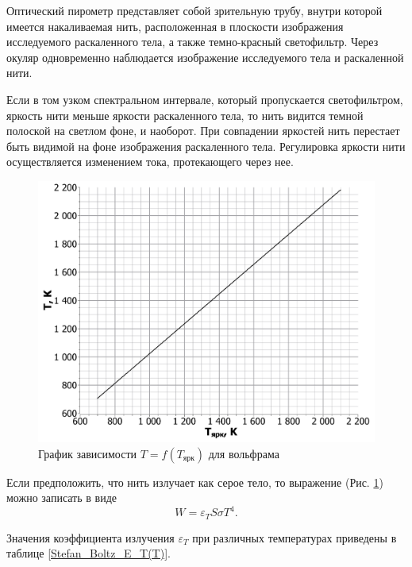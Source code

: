 	Оптический пирометр представляет собой зрительную трубу, внутри которой имеется накаливаемая нить, расположенная в плоскости изображения исследуемого раскаленного тела, а также темно-красный светофильтр. Через окуляр одновременно наблюдается изображение исследуемого тела и раскаленной нити.
	
	Если в том узком спектральном интервале, который пропускается светофильтром, яркость нити меньше яркости раскаленного тела, то нить видится темной полоской на светлом фоне, и наоборот. При совпадении яркостей нить перестает быть видимой на фоне изображения раскаленного тела. Регулировка яркости нити осуществляется изменением тока, протекающего через нее.
	
	\begin{figure}[h!]
		\centering
		\includegraphics[width=\linewidth]{./Pictures/T(T_bright).pdf}
		\caption{График зависимости $T = f(T_\text{ярк})$ для вольфрама}
		\label{Stefan_Boltz_T(T_bright)}
	\end{figure}
	
	
	Если предположить, что нить излучает как серое тело, то выражение
	(Рис. \ref{Stefan_Boltz_T(T_bright)}) можно записать в виде
	\begin{equation}
		W = \varepsilon_T S\sigma T^4.
		\label{Stefan_Boltz_W(E_T_and_T)}
	\end{equation}

 	Значения коэффициента излучения $\varepsilon_T$ при различных температурах приведены в таблице \ref{Stefan_Boltz_E_T(T)}.

 	\begin{table}[h!]
 		\centering
 	\caption{Поправочные коэффициенты излучения для вольфрама}
 	\label{Stefan_Boltz_E_T(T)}
 	\end{table}
 

